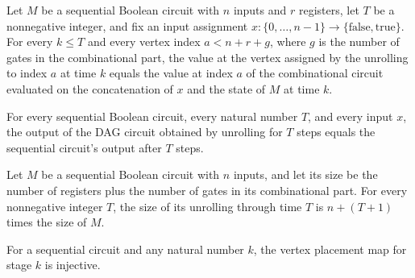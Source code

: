 \begin{theorem}
\label{BoolCircuit.SeqCircuit.unroll_values}
\leanok
{}
Let $M$ be a sequential Boolean circuit with $n$ inputs and $r$ registers, let $T$ be a
nonnegative integer, and fix an input assignment
$x\colon\{0,\ldots,n-1\}\to\{\mathrm{false},\mathrm{true}\}$. For every $k\le T$ and
every vertex index $a<n+r+g$, where $g$ is the number of gates in the combinational
part, the value at the vertex assigned by the unrolling to index $a$ at time $k$ equals
the value at index $a$ of the combinational circuit evaluated on the concatenation of
$x$ and the state of $M$ at time $k$.
\end{theorem}

\begin{theorem}
\label{BoolCircuit.SeqCircuit.unroll_eval}
\leanok
{}
For every sequential Boolean circuit, every natural number $T$, and every input $x$, the
output of the DAG circuit obtained by unrolling for $T$ steps equals the sequential
circuit's output after $T$ steps.
\end{theorem}

\begin{theorem}
\label{BoolCircuit.SeqCircuit.unroll_size}
\leanok
{}
Let $M$ be a sequential Boolean circuit with $n$ inputs, and let its size be the number
of registers plus the number of gates in its combinational part. For every nonnegative
integer $T$, the size of its unrolling through time $T$ is $n+(T+1)$ times the size of
$M$.
\end{theorem}

\begin{theorem}
\label{BoolCircuit.SeqCircuit.place_injective}
\leanok
{}
For a sequential circuit and any natural number $k$, the vertex placement map for stage
$k$ is injective.
\end{theorem}

